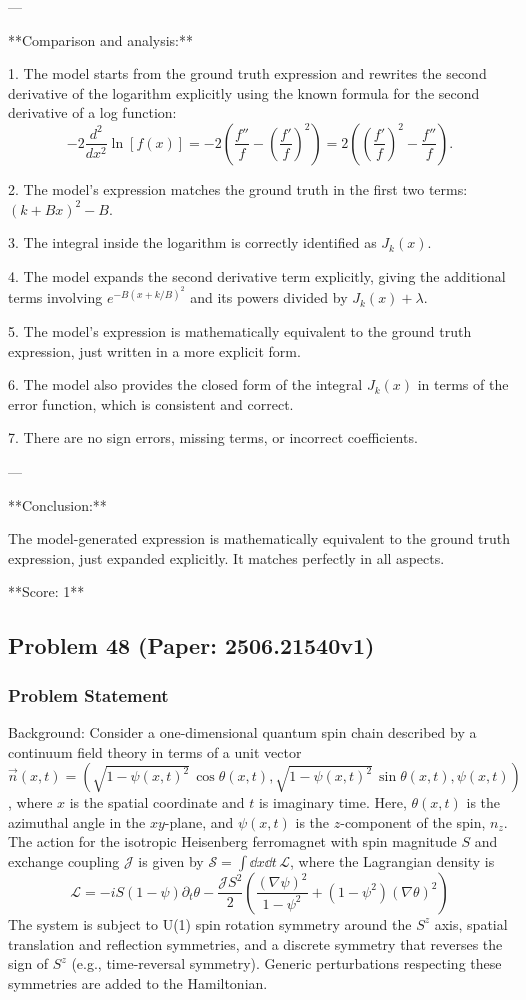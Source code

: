 \documentclass[10pt]{article}
\begin{document}
---

**Comparison and analysis:**

1. The model starts from the ground truth expression and rewrites the second derivative of the logarithm explicitly using the known formula for the second derivative of a log function:
\[
-2 \frac{d^2}{dx^2} \ln[f(x)] = -2 \left( \frac{f''}{f} - \left(\frac{f'}{f}\right)^2 \right) = 2 \left( \left(\frac{f'}{f}\right)^2 - \frac{f''}{f} \right).
\]

2. The model's expression matches the ground truth in the first two terms: \((k+Bx)^2 - B\).

3. The integral inside the logarithm is correctly identified as \(J_k(x)\).

4. The model expands the second derivative term explicitly, giving the additional terms involving \(e^{-B(x + k/B)^2}\) and its powers divided by \(J_k(x) + \lambda\).

5. The model's expression is mathematically equivalent to the ground truth expression, just written in a more explicit form.

6. The model also provides the closed form of the integral \(J_k(x)\) in terms of the error function, which is consistent and correct.

7. There are no sign errors, missing terms, or incorrect coefficients.

---

**Conclusion:**

The model-generated expression is mathematically equivalent to the ground truth expression, just expanded explicitly. It matches perfectly in all aspects.

**Score: 1**

\newpage
\subsection*{Problem 48 (Paper: 2506.21540v1)}
\subsubsection*{Problem Statement}
Background:
Consider a one-dimensional quantum spin chain described by a continuum field theory in terms of a unit vector $\vec{n}(x,t) = (\sqrt{1-\psi(x,t)^2}\, \cos\theta(x,t),\sqrt{1-\psi(x,t)^2}\,\sin\theta(x,t),\psi(x,t))$, where $x$ is the spatial coordinate and $t$ is imaginary time. Here, $\theta(x,t)$ is the azimuthal angle in the $xy$-plane, and $\psi(x,t)$ is the $z$-component of the spin, $n_z$. The action for the isotropic Heisenberg ferromagnet with spin magnitude $S$ and exchange coupling $\mathcal{J}$ is given by $\mathcal{S} = \int \dd x \dd t \, \mathcal{L}$, where the Lagrangian density is
$$ \mathcal{L} = -i S (1-\psi) \partial_t \theta - \frac{\mathcal{J}S^2}{2} \left( \frac{(\nabla \psi)^2}{1-\psi^2} + (1-\psi^2)(\nabla\theta)^2 \right) $$
The system is subject to U(1) spin rotation symmetry around the $S^z$ axis, spatial translation and reflection symmetries, and a discrete symmetry that reverses the sign of $S^z$ (e.g., time-reversal symmetry). Generic perturbations respecting these symmetries are added to the Hamiltonian.
\end{document}
